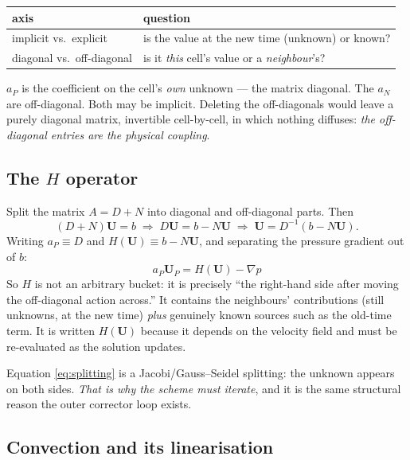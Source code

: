 \documentclass[11pt,a4paper]{article}
\newcommand{\uvec}{\mathbf{U}}
\begin{document}
\begin{center}
\begin{tabular}{@{}ll@{}}
\toprule
\textbf{axis} & \textbf{question} \\
\midrule
implicit vs.\ explicit & is the value at the new time (unknown) or known? \\
diagonal vs.\ off-diagonal & is it \emph{this} cell's value or a \emph{neighbour}'s? \\
\bottomrule
\end{tabular}
\end{center}

\noindent $a_P$ is the coefficient on the cell's \emph{own} unknown --- the
matrix diagonal. The $a_N$ are off-diagonal. Both may be implicit. Deleting the
off-diagonals would leave a purely diagonal matrix, invertible cell-by-cell,
in which nothing diffuses: \emph{the off-diagonal entries are the physical
coupling}.

\subsection{The \texorpdfstring{$H$}{H} operator}

Split the matrix $A = D + N$ into diagonal and off-diagonal parts. Then
\begin{equation}
  (D+N)\uvec = b
  \;\Longrightarrow\;
  D\uvec = b - N\uvec
  \;\Longrightarrow\;
  \uvec = D^{-1}(b - N\uvec).
  \label{eq:splitting}
\end{equation}
Writing $a_P \equiv D$ and $H(\uvec) \equiv b - N\uvec$, and separating the
pressure gradient out of $b$:
\begin{equation}
  \boxed{\; a_P \uvec_P = H(\uvec) - \nabla p \;}
  \label{eq:aph}
\end{equation}
So $H$ is not an arbitrary bucket: it is precisely ``the right-hand side after
moving the off-diagonal action across.'' It contains the neighbours'
contributions (still unknowns, at the new time) \emph{plus} genuinely known
sources such as the old-time term. It is written $H(\uvec)$ because it depends
on the velocity field and must be re-evaluated as the solution updates.

Equation \eqref{eq:splitting} is a Jacobi/Gauss--Seidel splitting: the unknown
appears on both sides. \emph{That is why the scheme must iterate}, and it is the
same structural reason the outer corrector loop exists.

\subsection{Convection and its linearisation}
\end{document}
